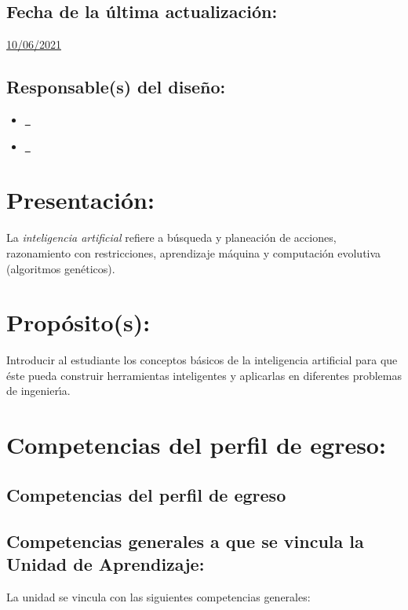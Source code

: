 \documentclass[10 pt]{article}
\begin{document}
\subsection{Fecha de la \'{u}ltima actualizaci\'{o}n:} \underline{10/06/2021}
\subsection{Responsable(s) del dise\~{n}o:}
\begin{itemize}[label={}]
\item \underline{\nromeo~\romeo}
\item \underline{\nelisa~\elisa}
\end{itemize}
\newpage
\section{Presentaci\'{o}n:}

La {\em inteligencia artificial} refiere a b\'{u}squeda y
planeaci\'{o}n de acciones, razonamiento con restricciones,
aprendizaje m\'{a}quina y computaci\'{o}n evolutiva (algoritmos
gen\'{e}ticos).

\section{Prop\'{o}sito(s):}

Introducir al estudiante los conceptos b\'{a}sicos de la inteligencia
artificial para que \'{e}ste pueda construir herramientas inteligentes
y aplicarlas en diferentes problemas de ingenier\'{\i}a.

\section{Competencias del perfil de egreso:}
\subsection{Competencias del perfil de egreso}






  
\subsection{Competencias generales a que se vincula la Unidad de
  Aprendizaje:}

  La unidad se vincula con las siguientes competencias generales:
  
\end{document}
